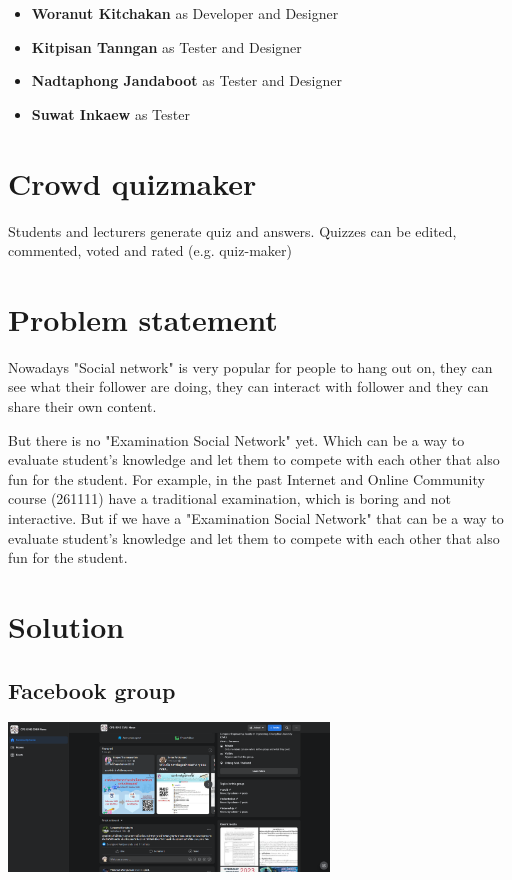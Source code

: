 \documentclass[a4paper, 12pt]{report}
\begin{document}
\begin{itemize}
            \item \textbf{Woranut Kitchakan} as Developer and Designer

            \item \textbf{Kitpisan Tanngan} as Tester and Designer

            \item \textbf{Nadtaphong Jandaboot} as Tester and Designer

            \item \textbf{Suwat Inkaew} as Tester

        \end{itemize}

    \pagebreak
    \section*{Crowd quizmaker}
    Students and lecturers generate quiz and answers. Quizzes can be edited, commented, voted and rated (e.g. quiz-maker)

    \section*{Problem statement}
    
    Nowadays "Social network" is very popular for people to hang out on, they can see what their follower are doing, they can interact with follower and they can share their own content.

    But there is no "Examination Social Network" yet. Which can be a way to evaluate student's knowledge and let them to compete with each other that also fun for the student. For example, in the past Internet and Online Community course (261111) have a traditional examination, which is boring and not interactive. But if we have a "Examination Social Network" that can be a way to evaluate student's knowledge and let them to compete with each other that also fun for the student.
    
    \pagebreak
    \section*{Solution}

    \subsection*{Facebook group}
    \begin{center}
        \includegraphics[height=150px]{facebook_group.png}
    \end{center}
\end{document}
